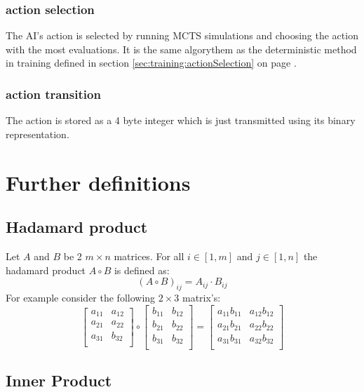 \documentclass[12pt]{article}
\newcommand{\sectionref}[1]{section \ref{#1} on page \pageref{#1}}
\begin{document}
\subsubsection{action selection}
The AI's action is selected by running MCTS simulations and choosing the action with the most evaluations. It is the same algorythem as the deterministic method in training defined in \sectionref{sec:training:actionSelection}.
\subsubsection{action transition}
The action is stored as a 4 byte integer which is just transmitted using its binary representation.

\section{Further definitions}
\subsection{Hadamard product}\label{sec:hadamerd_product}
Let \(A\) and \(B\) be 2 \(m \times n\) matrices. For all \(i \in [1, m]\) and \(j \in [1, n]\)
the hadamard product \(A \circ B\) is defined as:
\begin{equation} \label{eq:defs:Hadamard product}
\left(A \circ B\right)_{ij} = A_{ij} \cdot B_{ij}
\end{equation}
For example consider the following \(2 \times 3\) matrix's:
\[
\left[
\begin{array}{ll}
a_{11} & a_{12} \\
a_{21} & a_{22} \\
a_{31} & b_{32} \\
\end{array}
\right] \circ 
\left[
\begin{array}{ll}
b_{11} & b_{12} \\
b_{21} & b_{22} \\
b_{31} & b_{32} \\
\end{array}
\right] = 
\left[
\begin{array}{ll}
a_{11}b_{11} & a_{12}b_{12} \\
a_{21}b_{21} & a_{22}b_{22} \\
a_{31}b_{31} & a_{32}b_{32} \\
\end{array}
\right]
\]

\subsection{Inner Product}
\end{document}
